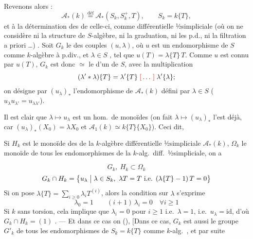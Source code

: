 \documentclass[11pt,a4paper]{article}
\begin{document}
Revenons alors :
\[
  \mathcal{A}_*(k) \overset{\text{déf}}{=} \mathcal{A}_*(S_k, S_k^+, T), \qquad S_k = k\{T\},
\]
et à la détermination des  de celle-ci, comme   différentielle ½simpliciale (où on ne considère \struck{\ill{}} ni la structure de $S$-algèbre, ni la graduation, ni les p.d., ni la filtration a priori …) . Soit $G_k$ le   des couples $(u, \lambda)$, où $u$ est un endomorphisme de $S$ comme $k$-algèbre à p.div., et $\lambda \in S$ , tel que $u(T) = \lambda\{T\}\, T$. Comme $u$ \struck{\ill{}} est connu par $u(T)$, $G_k$ est donc $\simeq$ le   \ill{}  d'un \ill{}  de $S$, avec la multiplication
\[
  (\lambda' * \lambda)\{T\} = \lambda'\{T\} \; \text{\ill{}} \; \lambda'\{\lambda\} ;
\]
on désigne par $(u_\lambda)_*$ l'endomorphisme de $\mathcal{A}_*(k)$ défini par $\lambda \in S$ ( $u_\lambda u_{\lambda'} = u_{\lambda \lambda'}$).

Il est clair que $\lambda \mapsto u_\lambda$ est un hom.\ de monoïdes  (on fait $\lambda \mapsto (u_\lambda)_*$ l'est déjà, car $(u_\lambda)_*(X_0) = \lambda X_0$ et $\mathcal{A}_1(k) \simeq k\{T\}\{X_0\}$). Ceci dit,

Si $H_k$ est le monoïde des  de la $k$-algèbre différentielle ½simpliciale $\mathcal{A}_*(k)$,  $\Omega_k$ le monoïde de tous les endomorphismes de la $k$-alg.\ diff.\ ½simpliciale, on a

\[
  G_k,\ H_k \subset \Omega_k
\]
\[
  G_k \cap H_k = \bigl\{ u_\lambda \bigm| \lambda \in S_k,\ \lambda T = T \text{ i.e. } (\lambda\{T\} - 1)\, T = 0 \bigr\}
\]
Si on pose $\lambda\{T\} = \sum_{i \geq 0} \lambda_i T^{(i)}$, alors la condition sur $\lambda$ s'exprime
\[
  \boxed{\lambda_0 = 1} \qquad \boxed{(i+1)\, \lambda_i = 0 \quad \forall i \geq 1}
\]
  Si $k$ sans torsion, cela implique que $\lambda_i = 0$ pour $i \geq 1$ i.e.\ $\lambda = 1$, i.e.\ $u_\lambda = \mathrm{id}$, d'où $G_k \cap H_k = (1)$ . --- Et dans ce cas on  (), [Dans ce cas, $G_k$ est aussi le groupe $G'_k$ de tous les endomorphismes de $S_k = k\{T\}$ comme $k$-alg.\ ,  et par suite
\end{document}
